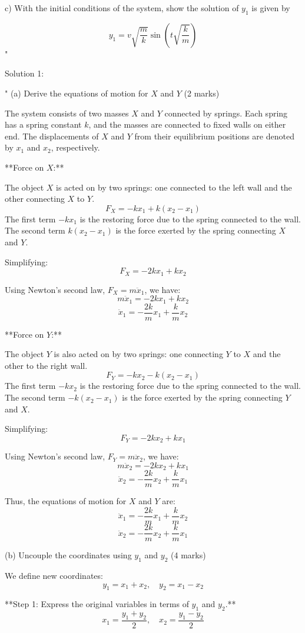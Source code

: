 c) With the initial conditions of the system, show the solution of \( y_{1} \) is given by 
    
\[
y_{1} = v \sqrt{\frac{m}{k}} \sin(t \sqrt{\frac{k}{m}})
\]"

Solution 1: 

"
(a) Derive the equations of motion for $X$ and $Y$ (2 marks)

The system consists of two masses $X$ and $Y$ connected by springs. Each spring has a spring constant $k$, and the masses are connected to fixed walls on either end. The displacements of $X$ and $Y$ from their equilibrium positions are denoted by $x_1$ and $x_2$, respectively.

**Force on $X$:**

The object $X$ is acted on by two springs: one connected to the left wall and the other connecting $X$ to $Y$.
\[
F_X = -k x_1 + k (x_2 - x_1)
\]
The first term $-k x_1$ is the restoring force due to the spring connected to the wall. The second term $k (x_2 - x_1)$ is the force exerted by the spring connecting $X$ and $Y$.

Simplifying:
\[
F_X = -2k x_1 + k x_2
\]

Using Newton's second law, $F_X = m \ddot{x}_1$, we have:
\[
m \ddot{x}_1 = -2k x_1 + k x_2
\]
\[
\ddot{x}_1 = -\frac{2k}{m} x_1 + \frac{k}{m} x_2
\]

**Force on $Y$:**

The object $Y$ is also acted on by two springs: one connecting $Y$ to $X$ and the other to the right wall.
\[
F_Y = -k x_2 - k (x_2 - x_1)
\]
The first term $-k x_2$ is the restoring force due to the spring connected to the wall. The second term $-k (x_2 - x_1)$ is the force exerted by the spring connecting $Y$ and $X$.

Simplifying:
\[
F_Y = -2k x_2 + k x_1
\]

Using Newton's second law, $F_Y = m \ddot{x}_2$, we have:
\[
m \ddot{x}_2 = -2k x_2 + k x_1
\]
\[
\ddot{x}_2 = -\frac{2k}{m} x_2 + \frac{k}{m} x_1
\]

Thus, the equations of motion for $X$ and $Y$ are:
\[
\ddot{x}_1 = -\frac{2k}{m} x_1 + \frac{k}{m} x_2
\]
\[
\ddot{x}_2 = -\frac{2k}{m} x_2 + \frac{k}{m} x_1
\]

(b) Uncouple the coordinates using $y_1$ and $y_2$ (4 marks)

We define new coordinates:
\[
y_1 = x_1 + x_2, \quad y_2 = x_1 - x_2
\]

**Step 1: Express the original variables in terms of $y_1$ and $y_2$.**
\[
x_1 = \frac{y_1 + y_2}{2}, \quad x_2 = \frac{y_1 - y_2}{2}
\]

